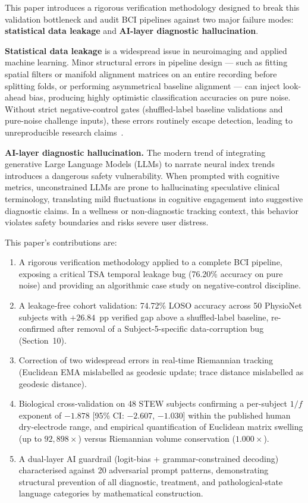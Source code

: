 \documentclass[11pt]{article}
\begin{document}
This paper introduces a rigorous verification methodology designed to break this validation bottleneck and audit BCI pipelines against two major failure modes: \textbf{statistical data leakage} and \textbf{AI-layer diagnostic hallucination}.

\textbf{Statistical data leakage} is a widespread issue in neuroimaging and applied machine learning. Minor structural errors in pipeline design --- such as fitting spatial filters or manifold alignment matrices on an entire recording before splitting folds, or performing asymmetrical baseline alignment --- can inject look-ahead bias, producing highly optimistic classification accuracies on pure noise. Without strict negative-control gates (shuffled-label baseline validations and pure-noise challenge inputs), these errors routinely escape detection, leading to unreproducible research claims~\cite{varoquaux2018,lotte2014}.

\textbf{AI-layer diagnostic hallucination.} The modern trend of integrating generative Large Language Models (LLMs) to narrate neural index trends introduces a dangerous safety vulnerability. When prompted with cognitive metrics, unconstrained LLMs are prone to hallucinating speculative clinical terminology, translating mild fluctuations in cognitive engagement into suggestive diagnostic claims. In a wellness or non-diagnostic tracking context, this behavior violates safety boundaries and risks severe user distress.

This paper's contributions are:
\begin{enumerate}[leftmargin=*]
\item A rigorous verification methodology applied to a complete BCI pipeline, exposing a critical TSA temporal leakage bug (76.20\% accuracy on pure noise) and providing an algorithmic case study on negative-control discipline.
\item A leakage-free cohort validation: 74.72\% LOSO accuracy across 50 PhysioNet subjects with $+26.84$~pp verified gap above a shuffled-label baseline, re-confirmed after removal of a Subject-5-specific data-corruption bug (Section~10).
\item Correction of two widespread errors in real-time Riemannian tracking (Euclidean EMA mislabelled as geodesic update; trace distance mislabelled as geodesic distance).
\item Biological cross-validation on 48 STEW subjects confirming a per-subject $1/f$ exponent of $-1.878$ [95\% CI: $-2.607$, $-1.030$] within the published human dry-electrode range, and empirical quantification of Euclidean matrix swelling (up to $92{,}898\times$) versus Riemannian volume conservation ($1.000\times$).
\item A dual-layer AI guardrail (logit-bias + grammar-constrained decoding) characterised against 20 adversarial prompt patterns, demonstrating structural prevention of all diagnostic, treatment, and pathological-state language categories by mathematical construction.
\end{enumerate}
\end{document}
